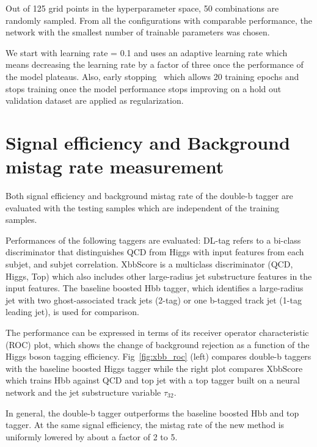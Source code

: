 \par Out of 125 grid points in the hyperparameter space, 50 combinations are randomly sampled. From all the configurations with comparable performance, the network with the smallest number of trainable parameters was chosen. 
\par We start with learning rate = 0.1 and uses an adaptive learning rate which means decreasing the learning rate by a factor of three once the performance of the model plateaus. Also, early stopping~\cite{Yao07onearly} which allows 20 training epochs and stops training once the model performance stops improving on a hold out validation dataset are applied as regularization. 

\section{Signal efficiency and Background mistag rate measurement}
\label{sec:per}

\par Both signal efficiency and background mistag rate of the double-b tagger are evaluated with the testing samples which are independent of the training samples.

\par Performances of the following taggers are evaluated: DL-tag refers to a bi-class discriminator that distinguishes QCD from Higgs with input features from each subjet, and subjet correlation. 
XbbScore is a multiclass discriminator (QCD, Higgs, Top) which also includes other large-radius jet substructure features in the input features. 
The baseline boosted Hbb tagger, which identifies a large-radius jet with two ghost-associated track jets (2-tag) or one b-tagged track jet (1-tag leading jet), is used for comparison.
\par The performance can be expressed in terms of its receiver operator characteristic (ROC) plot, which shows the change of background rejection as a function of the Higgs boson tagging efficiency. Fig~\ref{fig:xbb_roc} (left) compares double-b taggers with the baseline boosted Higgs tagger while the right plot compares XbbScore which trains Hbb against QCD and top jet with a top tagger built on a neural network and the jet substructure variable $\tau_{32}$.
\par In general, the double-b tagger outperforms the baseline boosted Hbb and top tagger. At the same signal efficiency, the mistag rate of the new method is uniformly lowered by about a factor of 2 to 5.

